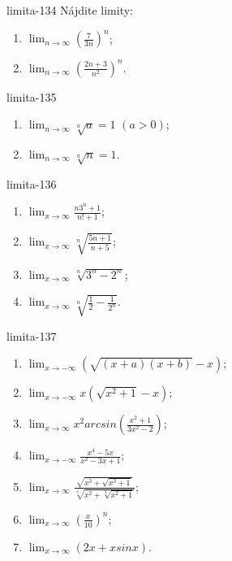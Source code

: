 \begin{defproblem}{limita-134}
Nájdite limity:
\begin{enumerate}
\item $\lim_{n \rightarrow \infty} (\frac{7}{3n})^n$;
\item $\lim_{n \rightarrow \infty} (\frac{2n+3}{n^2})^n$.
\end{enumerate}
\end{defproblem}

\begin{defproblem}{limita-135}
\begin{enumerate}
\item $\lim_{n \rightarrow \infty} \sqrt[n]{a}=1$  $(a>0)$;
\item $\lim_{n \rightarrow \infty} \sqrt[n]{n}=1$.
\end{enumerate}
\end{defproblem}

\begin{defproblem}{limita-136}
\begin{multicols}{2}
\begin{enumerate}
    \item $\lim_{{x \rightarrow \infty}} \frac{n 3^n+1}{n!+1}$;
    \item $\lim_{{x \rightarrow \infty}} \sqrt[n]{\frac{5n+1}{n+5}}$;
    \item $\lim_{{x \rightarrow \infty}} \sqrt[n]{3^n-2^n}$;
    \item $\lim_{{x \rightarrow \infty}} \sqrt[n]{\frac{1}{2}-\frac{1}{2^n}}$.
\end{enumerate}
\end{multicols}
\end{defproblem}

\begin{defproblem}{limita-137}
\begin{multicols}{2}
\begin{enumerate}
    \item $\lim_{{x \rightarrow -\infty}} (\sqrt{(x+a)(x+b)}-x)$;
    \item $\lim_{{x \rightarrow -\infty}} x(\sqrt{x^2+1}-x)$;
    \item $\lim_{{x \rightarrow \infty}} x^2arcsin(\frac{x^2+1}{3x^2-2})$;
    \item $\lim_{{x \rightarrow -\infty}} \frac{x^4-5x}{x^2-3x+1}$;
    \item $\lim_{{x \rightarrow \infty}} \frac{\sqrt{x^3+\sqrt{x^3+1}}}{\sqrt[3]{x^2+\sqrt[3]{x^2+1}}}$;
    \item $\lim_{{x \rightarrow \infty}} (\frac{x}{10})^n$;
    \item $\lim_{{x \rightarrow \infty}} (2x+x sin x)$.
\end{enumerate}
\end{multicols}
\end{defproblem}

